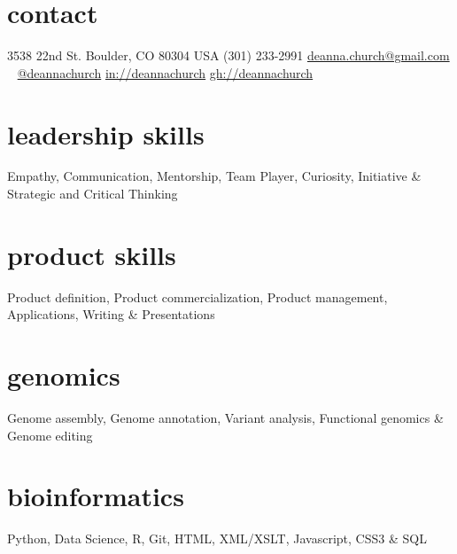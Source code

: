 \documentclass[]{dmc-cv} %
\begin{document}


\begin{aside} %
    \section{contact}
    3538 22nd St.
    Boulder, CO 80304
    USA
    {\Large\textcolor{gray}{\Mobilefone}} \hfill (301) 233-2991
    \href{mailto:deanna.church@gmail.com}{deanna.church@gmail.com}
    ~
    \tlogo \hfill \href{http://twitter.com/deannachurch}{@deannachurch}
    \llogo \hfill \href{https://www.linkedin.com/in/deanna-church-a8749513/}{in://deannachurch}
    \ghlogo \hfill \href{https://www.github.com/deannachurch}{gh://deannachurch}
    ~
    \section{leadership skills}
    Empathy, Communication, 
    Mentorship, Team Player,
    Curiosity, Initiative \&
    Strategic and 
    Critical Thinking
    
    \section{product skills}
    Product definition,
    Product commercialization, 
    Product management,
    Applications,  
    Writing \& Presentations
    
    \section{genomics}
    Genome assembly,
    Genome annotation,
    Variant analysis,
    Functional genomics \& 
    Genome editing
    
    \section{bioinformatics}
    Python, Data Science, R, 
    Git, HTML, XML/XSLT, 
    Javascript, CSS3 \& SQL
    
    \end{aside}
\end{document}
